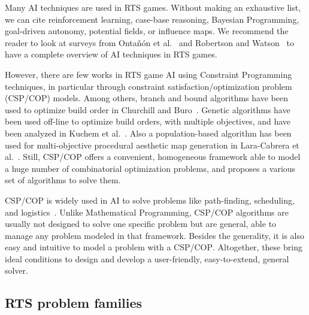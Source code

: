\documentclass[journal]{IEEEtran}
\newcommand{\csp}{\textsc{CSP}\xspace}
\newcommand{\cop}{\textsc{COP}\xspace}
\begin{document}
Many AI techniques are used in RTS games. Without making an exhaustive
list,  we  can  cite   reinforcement  learning,  case-base  reasoning,
Bayesian Programming, goal-driven autonomy,  potential fields, or influence maps. We
recommend  the  reader to  look  at  surveys from  Onta{\~n}{\'o}n  et
al.~\cite{OntanonSURCM13} and Robertson and Watson~\cite{RobertsonW14}
to have a complete overview of AI techniques in RTS games.

However,  there  are  few  works  in  RTS  game  AI  using  Constraint
Programming    techniques,    in   particular    through    constraint
satisfaction/optimization problem  (\csp/\cop) models.   Among others,
branch and bound algorithms have been  used to optimize build order in
Churchill and Buro~\cite{ChurchillB11}.   Genetic algorithms have been
used off-line to  optimize build orders, with  multiple objectives, and
have  been   analyzed  in   Kuchem  et  al.~\cite{KuchemPR13}.   Also  a
population-based   algorithm  has   been   used  for   multi-objective
procedural    aesthetic   map    generation    in   Lara-Cabrera    et
al.~\cite{LaraCF14}.    Still,   \csp/\cop    offers   a   convenient,
homogeneous framework able to model a huge number of combinatorial optimization problems,  and proposes  a various  set of  algorithms to
solve them.

\csp/\cop is widely used in  AI to solve problems
like  path-finding, scheduling,  and  logistics~\cite{constraint_survey}.  Unlike  Mathematical
Programming, \csp/\cop  algorithms are  usually not designed  to solve
one  specific problem  but are  general, able  to manage  any problem
modeled in that framework. Besides the generality, it is also easy and
intuitive  to model  a problem  with a  \csp/\cop.  Altogether,  these
bring  ideal  conditions  to   design  and  develop  a  user-friendly,
easy-to-extend, general solver.


\subsection{RTS problem families}
\end{document}
